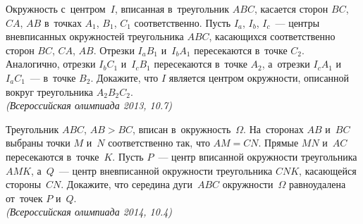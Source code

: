 \begin{problems}
\item
Окружность с~центром~$I$, вписанная в~треугольник $ABC$, касается сторон
$BC$, $CA$, $AB$ в~точках $A_1$, $B_1$, $C_1$ соответственно.
Пусть $I_a$, $I_b$, $I_c$~--- центры вневписанных окружностей треугольника
$ABC$, касающихся соответственно сторон $BC$, $CA$, $AB$.
Отрезки $I_a B_1$ и~$I_b A_1$ пересекаются в~точке $C_2$.
Аналогично, отрезки $I_b C_1$ и~$I_c B_1$ пересекаются в~точке $A_2$, а~отрезки
$I_c A_1$ и~$I_a C_1$~--- в~точке $B_2$.
Докажите, что $I$ является центром окружности, описанной вокруг треугольника
$A_2 B_2 C_2$.
\\\emph{(Всероссийская олимпиада 2013, 10.7)}

\item
Треугольник $ABC$, $AB > BC$, вписан в~окружность~$\Omega$.
На~сторонах $AB$ и~$BC$ выбраны точки $M$ и~$N$ соответственно так, что
$AM = CN$.
Прямые $MN$ и~$AC$ пересекаются в~точке~$K$.
Пусть $P$~--- центр вписанной окружности треугольника $AMK$, а~$Q$~--- центр
вневписанной окружности треугольника $CNK$, касающейся стороны~$CN$.
Докажите, что середина дуги~$ABC$ окружности~$\Omega$ равноудалена
от~точек $P$ и~$Q$.
\\\emph{(Всероссийская олимпиада 2014, 10.4)}

\end{problems}

